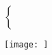 \documentclass[10pt,portrait]{article}
\makeatletter
\renewcommand{\subsection}{\@startsection{subsection}{2}{0mm}%
                                {-1explus -.5ex minus -.2ex}%
                                {0.5ex plus .2ex}%
                                {\normalfont\normalsize\bfseries}}
\makeatother
\begin{document}
            $
            \begin{cases}
                \text{}\\
                \text{}\\
                \text{}\\
                \text{}\\
            \end{cases}
            $

            \texttt{[image: ]}







\end{document}
